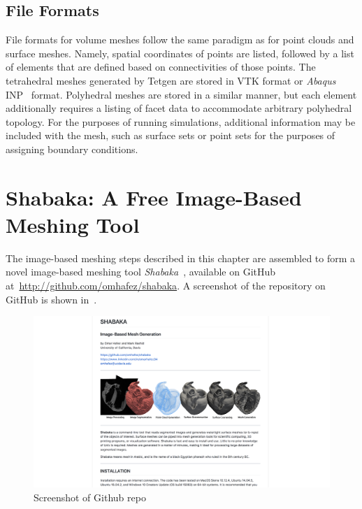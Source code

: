\subsection{File Formats}
\label{File Formats-MESH}
File formats for volume meshes follow the same paradigm as for point clouds and surface meshes. Namely, spatial coordinates of points are listed, followed by a list of elements that are defined based on connectivities of those points. The tetrahedral meshes generated by Tetgen are stored in VTK format or \textit{Abaqus} INP~\cite{abaqus} format. Polyhedral meshes are stored in a similar manner, but each element additionally requires a listing of facet data to accommodate arbitrary polyhedral topology. For the purposes of running simulations, additional information may be included with the mesh, such as surface sets or point sets for the purposes of assigning boundary conditions.

\section{Shabaka: A Free Image-Based Meshing Tool}

The image-based meshing steps described in this chapter are assembled to form a novel image-based meshing tool \textit{Shabaka}~\cite{shab}, available on GitHub at~\href{http://github.com/omhafez/shabaka}{{\url{http://github.com/omhafez/shabaka}}}. A screenshot of the repository on GitHub is shown in~.

\begin{figure}[ht!]
\centering
\vspace{2.5mm}
\includegraphics[width=1.0\textwidth]{media/2-shabaka/2-surf/7-shabaka.png}
\caption{Screenshot of Github repo}
\label{fig:github}
\end{figure}

